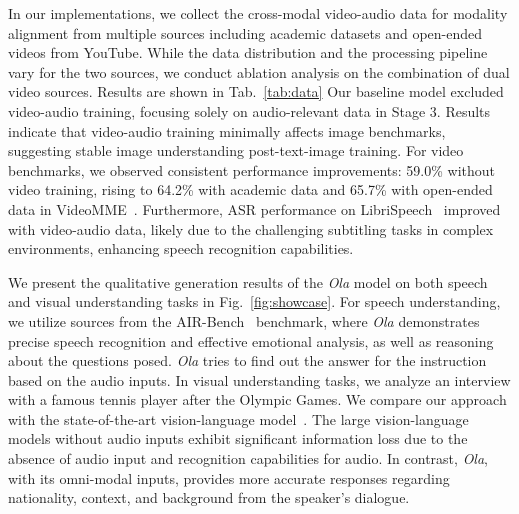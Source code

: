 In our implementations, we collect the cross-modal video-audio data for modality alignment from multiple sources including academic datasets and open-ended videos from YouTube. While the data distribution and the processing pipeline vary for the two sources, we conduct ablation analysis on the combination of dual video sources. Results are shown in Tab.~\ref{tab:data} Our baseline model excluded video-audio training, focusing solely on audio-relevant data in Stage 3.  Results indicate that video-audio training minimally affects image benchmarks, suggesting stable image understanding post-text-image training.  For video benchmarks, we observed consistent performance improvements: 59.0\% without video training, rising to 64.2\% with academic data and 65.7\% with open-ended data in VideoMME~\citep{fu2024videomme}. Furthermore, ASR performance on LibriSpeech~\citep{panayotov2015librispeech} improved with video-audio data, likely due to the challenging subtitling tasks in complex environments, enhancing speech recognition capabilities.

 We present the qualitative generation results of the \textit{Ola} model on both speech and visual understanding tasks in Fig.~\ref{fig:showcase}. For speech understanding, we utilize sources from the AIR-Bench~\citep{yang2024airbench} benchmark, where \textit{Ola} demonstrates precise speech recognition and effective emotional analysis, as well as reasoning about the questions posed. \textit{Ola} tries to find out the answer for the instruction based on the audio inputs. In visual understanding tasks, we analyze an interview with a famous tennis player after the Olympic Games. We compare our approach with the state-of-the-art vision-language model~\citep{li2024llavaov}. The large vision-language models without audio inputs exhibit significant information loss due to the absence of audio input and recognition capabilities for audio. In contrast, \textit{Ola}, with its omni-modal inputs, provides more accurate responses regarding nationality, context, and background from the speaker's dialogue.